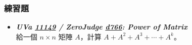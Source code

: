\subsubsection*{練習題}
\begin{itemize}[label={\Checkmark}]
\item \textbf{\textit{UVa \href{http://uva.onlinejudge.org/external/111/11149.html}{11149} / ZeroJudge \href{http://zerojudge.tw/ShowProblem?problemid=d766}{d766}: Power of Matrix}}\\
給一個 $n\times{n}$ 矩陣 $A$，計算 $A+A^2+A^3+\cdots{}+A^k$。
\end{itemize}